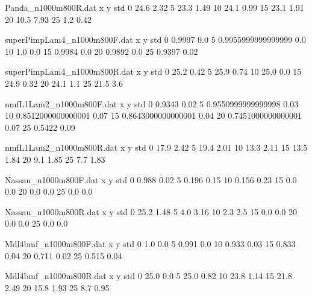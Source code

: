 \begin{filecontents}{Panda_n1000m800R.dat}
x y std
0 24.6 2.32
5 23.3 1.49
10 24.1 0.99
15 23.1 1.91
20 10.5 7.93
25 1.2 0.42
\end{filecontents}
\begin{filecontents}{superPimpLam4_n1000m800F.dat}
x y std
0 0.9997 0.0
5 0.9955999999999999 0.0
10 1.0 0.0
15 0.9984 0.0
20 0.9892 0.0
25 0.9397 0.02
\end{filecontents}
\begin{filecontents}{superPimpLam4_n1000m800R.dat}
x y std
0 25.2 0.42
5 25.9 0.74
10 25.0 0.0
15 24.9 0.32
20 24.1 1.1
25 21.5 3.6
\end{filecontents}
\begin{filecontents}{nmfL1Lam2_n1000m800F.dat}
x y std
0 0.9343 0.02
5 0.9550999999999998 0.03
10 0.8512000000000001 0.07
15 0.8643000000000001 0.04
20 0.7451000000000001 0.07
25 0.5422 0.09
\end{filecontents}
\begin{filecontents}{nmfL1Lam2_n1000m800R.dat}
x y std
0 17.9 2.42
5 19.4 2.01
10 13.3 2.11
15 13.5 1.84
20 9.1 1.85
25 7.7 1.83
\end{filecontents}
\begin{filecontents}{Nassau_n1000m800F.dat}
x y std
0 0.988 0.02
5 0.196 0.15
10 0.156 0.23
15 0.0 0.0
20 0.0 0.0
25 0.0 0.0
\end{filecontents}
\begin{filecontents}{Nassau_n1000m800R.dat}
x y std
0 25.2 1.48
5 4.0 3.16
10 2.3 2.5
15 0.0 0.0
20 0.0 0.0
25 0.0 0.0
\end{filecontents}
\begin{filecontents}{Mdl4bmf_n1000m800F.dat}
x y std
0 1.0 0.0
5 0.991 0.0
10 0.933 0.03
15 0.833 0.04
20 0.711 0.02
25 0.515 0.04
\end{filecontents}
\begin{filecontents}{Mdl4bmf_n1000m800R.dat}
x y std
0 25.0 0.0
5 25.0 0.82
10 23.8 1.14
15 21.8 2.49
20 15.8 1.93
25 8.7 0.95
\end{filecontents}

